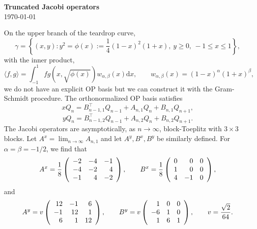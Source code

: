 \documentclass[12pt,a4paper]{article}
\begin{document}
\begin{center}
{\Large \textbf{Truncated Jacobi operators}}\\
{\footnotesize \today}
\end{center}

\noindent On the upper branch of the teardrop curve,
\begin{equation*}
\gamma = \left\lbrace (x,y): y^2 = \phi(x) := \frac{1}{4}(1 - x)^2(1+x),\: y\geq 0, \: -1 \leq x \leq 1\right\rbrace,
\end{equation*}
with the inner product,
\begin{equation*}
\langle f,g \rangle = \int_{-1}^{1} fg\left(x,\sqrt{\phi(x)}\right) w_{\alpha,\beta}(x)\mathrm{d}x, \qquad w_{\alpha,\beta}(x) = (1-x)^{\alpha}(1+x)^{\beta},
\end{equation*}
we do not have an explicit OP basis but we can construct it with the Gram-Schmidt procedure. The orthonormalized OP basis satisfies 
\begin{equation*}
x Q_n = B^{\intercal}_{n-1,1}Q_{n-1} + A_{n,1}Q_n + B_{n,1}Q_{n+1},
\end{equation*}
\begin{equation*}
y Q_n = B^{\intercal}_{n-1,2}Q_{n-1} + A_{n,2}Q_n + B_{n,2}Q_{n+1}.
\end{equation*}
The Jacobi operators are asymptotically, as $n \to \infty$, block-Toeplitz with $3\times3$ blocks.
Let $A^x = \lim_{n \to \infty}A_{n,1}$ and let $A^y, B^x, B^y$ be similarly defined. For $\alpha = \beta = -1/2$, we find that
\begin{equation}
A^x = 
\frac{1}{8}\left(
\renewcommand{\arraystretch}{1.0}
\begin{array}{r r r}
-2 & -4 & -1\\
-4 & -2 & 4\\
-1 & 4  & -2
\end{array}
\right), \qquad
B^x = \frac{1}{8} \left(
\renewcommand{\arraystretch}{1.0}
\begin{array}{r r r}
0 & 0 & 0\\
1 & 0 & 0\\
4 & -1  & 0
\end{array}
\right),
\label{eq:xlimmats}
\end{equation}
and
\begin{equation}
A^y = v\left(
\renewcommand{\arraystretch}{1.0}
\begin{array}{r r r}
12 & -1 & 6 \\
-1 & 12 & 1 \\
6 & 1 & 12
\end{array}
\right)
, \qquad
B^y = 
v\left(
\renewcommand{\arraystretch}{1.0}
\begin{array}{r r r}
1 & 0& 0\\
-6& 1 &0\\
1 &6& 1
\end{array}
\right),
\qquad
v = \frac{\sqrt{2}}{64}.
\label{eq:ylimmats}
\end{equation}
\end{document}
